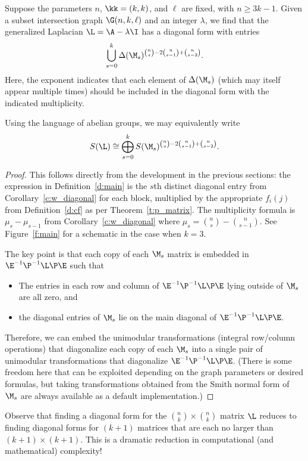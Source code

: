 \begin{theorem}\label{t:main}
Suppose the parameters $n$, $\kk = (k,k)$, and $\ell$ are fixed, with $n \geq 3k-1$.  Given a subset intersection graph $\G(n, k, \ell)$ and an integer $\lambda$, we find that the generalized Laplacian $\L = \A - \lambda \I$ has a diagonal form with entries
\[ \bigcup_{s = 0}^k \Delta(\M_s)^{ \binom{n}{s} - 2 \binom{n}{s-1} + \binom{n}{s-2}}. \]
Here, the exponent indicates that each element of $\Delta(\M_s)$ (which may itself appear multiple times) should be included in the diagonal form with the indicated multiplicity.

Using the language of abelian groups, we may equivalently write
\[
S(\L) \cong \bigoplus_{s=0}^{k} S(\M_s)^{ \binom{n}{s} - 2 \binom{n}{s-1} + \binom{n}{s-2}}.
\]
\end{theorem}
\begin{proof}
This follows directly from the development in the previous sections:  the expression in Definition~\ref{d:main} is the $s$th distinct diagonal entry from Corollary~\ref{c:w_diagonal} for each block, multiplied by the appropriate $f_i(j)$ from Definition~\ref{d:cf} as per Theorem~\ref{t:p_matrix}.  
The multiplicity formula is $\mu_s - \mu_{s-1}$ from Corollary~\ref{c:w_diagonal} where $\mu_s = \binom{n}{s} - \binom{n}{s-1}$.
See Figure~\ref{f:main} for a schematic in the case when $k=3$.

The key point is that each copy of each $\M_s$ matrix is embedded in $\E^{-1} \P^{-1} \L \P \E$ such that
\begin{itemize}
    \item The entries in each row and column of $\E^{-1} \P^{-1} \L \P \E$ lying outside of $\M_s$ are all zero, and
    \item the diagonal entries of $\M_s$ lie on the main diagonal of $\E^{-1} \P^{-1} \L \P \E$.
\end{itemize}
Therefore, we can embed the unimodular transformations (\ie integral row/column operations) that diagonalize each copy of each $\M_s$ into a single pair of unimodular transformations that diagonalize $\E^{-1} \P^{-1} \L \P \E$.  (There is some freedom here that can be exploited depending on the graph parameters or desired formulas, but taking transformations obtained from the Smith normal form of $\M_s$ are always available as a default implementation.)
\end{proof}

\begin{remark}
Observe that finding a diagonal form for the $\binom{n}{k} \times \binom{n}{k}$ matrix $\L$ reduces to finding diagonal forms for $(k+1)$ matrices that are each no larger than \mbox{$(k+1) \times (k+1)$}.  This is a dramatic reduction in computational (and mathematical) complexity!
\end{remark}


